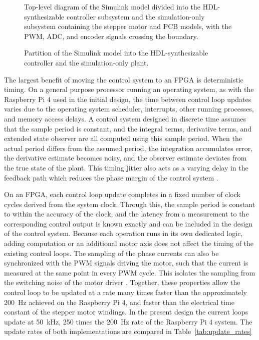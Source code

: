 \begin{figure}[htbp]
	\centering
		{Top-level diagram of the Simulink model divided into the HDL-synthesizable controller subsystem and the simulation-only subsystem containing the stepper motor and PCB models, with the PWM, ADC, and encoder signals crossing the boundary.}
	\caption[Partition of the Simulink model]{Partition of the Simulink model into the HDL-synthesizable controller and the simulation-only plant.}
	\label{fig:simulink_partition}
\end{figure}

The largest benefit of moving the control system to an FPGA is deterministic timing. On a general purpose processor running an operating system, as with the Raspberry Pi 4 used in the initial design, the time between control loop updates varies due to the operating system scheduler, interrupts, other running processes, and memory access delays. A control system designed in discrete time assumes that the sample period is constant, and the integral terms, derivative terms, and extended state observer are all computed using this sample period. When the actual period differs from the assumed period, the integration accumulates error, the derivative estimate becomes noisy, and the observer estimate deviates from the true state of the plant. This timing jitter also acts as a varying delay in the feedback path which reduces the phase margin of the control system \cite{binfet_implementation_2026, cervin_how_2003, franklin_digital_1998}.

On an FPGA, each control loop update completes in a fixed number of clock cycles derived from the system clock. Through this, the sample period is constant to within the accuracy of the clock, and the latency from a measurement to the corresponding control output is known exactly and can be included in the design of the control system. Because each operation runs in its own dedicated logic, adding computation or an additional motor axis does not affect the timing of the existing control loops. The sampling of the phase currents can also be synchronized with the PWM signals driving the motor, such that the current is measured at the same point in every PWM cycle. This isolates the sampling from the switching noise of the motor driver \cite{blasko_sampling_1998}. Together, these properties allow the control loop to be updated at a rate many times faster than the approximately \SI{200}{\hertz} achieved on the Raspberry Pi 4, and faster than the electrical time constant of the stepper motor windings. In the present design the current loops update at \SI{50}{\kilo\hertz}, 250 times the \SI{200}{\hertz} rate of the Raspberry Pi 4 system. The update rates of both implementations are compared in Table~\ref{tab:update_rates}

